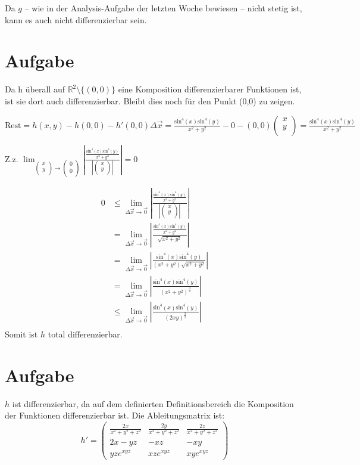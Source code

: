 \documentclass[10pt,a4paper,parskip=half]{scrartcl}
\newcommand{\vectwo}[2]{\left(\begin {array} {c} #1 \\ #2 \\ \end {array} \right)}
\begin{document}
\begin{enumerate}[(i)]
Da $g$ -- wie in der Analysis-Aufgabe der letzten Woche bewiesen -- nicht stetig ist, kann es auch nicht differenzierbar sein.
\section{Aufgabe}
Da h überall auf $\mathbb R^2\setminus{\{(0,0)\}}$ eine Komposition differenzierbarer Funktionen ist, ist sie dort auch differenzierbar. Bleibt dies noch für den Punkt (0,0) zu zeigen.

$\text{Rest} = h(x,y) - h(0,0) - h'(0,0) \Delta \vec x = \frac{\text{sin}^4(x)\text{sin}^4(y)}{x^2 + y^2} - 0 - (0,0) \vectwo{x}{y} = \frac{\text{sin}^4(x)\text{sin}^4(y)}{x^2 + y^2}$

Z.z. $\lim_{\vectwo{x}{y} \to \vectwo{0}{0}} \left|\frac{\frac{\text{sin}^4(x)\text{sin}^4(y)}{x^2 + y^2}}{\left|\vectwo{x}{y}\right|}\right| = 0$

\begin{align*}
0 &\le\lim_{\Delta \vec x \to \vec 0} \left|\frac{\frac{\text{sin}^4(x)\text{sin}^4(y)}{x^2 + y^2}}{\left|\vectwo{x}{y}\right|}\right| \\
&= \lim_{\Delta \vec x \to \vec 0} \left|\frac{\frac{\text{sin}^4(x)\text{sin}^4(y)}{x^2 + y^2}}{\sqrt{x^2+y^2}}\right| \\
&= \lim_{\Delta \vec x \to \vec 0} \left|\frac{\text{sin}^4(x)\text{sin}^4(y)}{(x^2 + y^2)\sqrt{x^2+y^2}}\right| \\
&= \lim_{\Delta \vec x \to \vec 0} \left|\frac{\text{sin}^4(x)\text{sin}^4(y)}{(x^2 + y^2)^{\frac{3}{2}}}\right| \\
&\le \lim_{\Delta \vec x \to \vec 0} \left|\frac{\text{sin}^4(x)\text{sin}^4(y)}{(2xy)^{\frac{3}{2}}}\right| \\
\end{align*}
Somit ist $h$ total differenzierbar.

\section{Aufgabe}
$h$ ist differenzierbar, da auf dem definierten Definitionsbereich die Komposition der Funktionen differenzierbar ist. Die Ableitungsmatrix ist:
$$h' =\begin{pmatrix}
\frac{2x}{x^2 + y^2 + z^2} & \frac{2y}{x^2 + y^2 + z^2} & \frac{2z}{x^2 + y^2 + z^2} \\
2x - yz & -xz & -xy \\
yze^{xyz}  & xze^{xyz} & xye^{xyz} 
\end{pmatrix}  $$


\end{enumerate}
\end{document}
